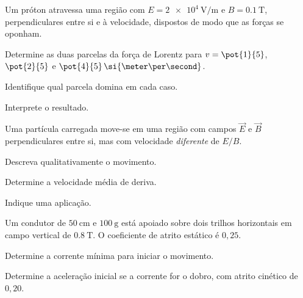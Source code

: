 \begin{questao}[3]{}

Um próton atravessa uma região com $E=\SI{2e4}{\volt\per\meter}$ e
$B=\SI{0.1}{\tesla}$, perpendiculares entre si e à velocidade, dispostos de
modo que as forças se oponham.
\begin{itensq}
\item Determine as duas parcelas da força de Lorentz para
      $v=\pot{1}{5}$, $\pot{2}{5}$ e $\pot{4}{5}\,\si{\meter\per\second}$.
\item Identifique qual parcela domina em cada caso.
\item Interprete o resultado.
\end{itensq}


\end{questao}
\begin{questao}[3]{}

Uma partícula carregada move-se em uma região com campos $\vec E$ e $\vec B$
perpendiculares entre si, mas com velocidade \emph{diferente} de $E/B$.
\begin{itensq}
\item Descreva qualitativamente o movimento.
\item Determine a velocidade média de deriva.
\item Indique uma aplicação.
\end{itensq}


\end{questao}
\begin{questao}[3]{}

Um condutor de $\SI{50}{\centi\meter}$ e $\SI{100}{\gram}$ está apoiado sobre
dois trilhos horizontais em campo vertical de $\SI{0.8}{\tesla}$. O
coeficiente de atrito estático é $0{,}25$.
\begin{itensq}
\item Determine a corrente mínima para iniciar o movimento.
\item Determine a aceleração inicial se a corrente for o dobro, com atrito
      cinético de $0{,}20$.
\end{itensq}


\end{questao}

